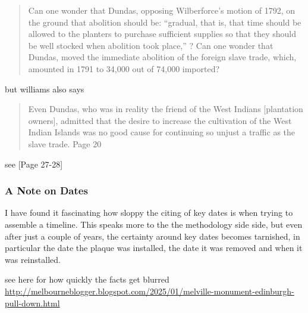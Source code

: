 \begin{quotation}
    Can one wonder that Dundas, 
            opposing Wilberforce’s motion of 1792, 
                    on the ground that abolition should be: 
                    “gradual, that is, that time should be allowed to the planters to purchase sufficient supplies so that they should be well stocked when abolition took place,'' ?
    Can one wonder that Dundas, 
    moved the immediate abolition of the foreign slave trade, 
     which, 
    amounted in 1791 to 34,000 out of 74,000 imported?
\end{quotation}
\cite{williams_1938}

but williams also says

\begin{quotation}
    Even Dundas, who was in reality the friend of the West Indians [plantation owners], admitted that the desire to increase the cultivation of the West Indian Islands was no good cause for continuing so unjust a traffic as the slave trade. Page 20
\end{quotation} 
see \cite{williams_1938}[Page 27-28]

\subsubsection{A Note on Dates}

I have found it fascinating how sloppy the citing of key dates is when trying to assemble a timeline. This speaks more to the the methodology side side, but even after just a couple of years, the certainty around  key dates becomes tarnished, in particular the date the plaque was installed, the date it was removed and when it was reinstalled.

see here for how quickly the facts get blurred \url{http://melbourneblogger.blogspot.com/2025/01/melville-monument-edinburgh-pull-down.html}